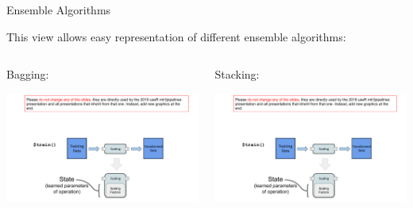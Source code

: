 \begin{frame}{Ensemble Algorithms}

	This view allows easy representation of different ensemble algorithms:

	\vspace{1cm}

		\begin{columns}
			\begin{column}{0.5\textwidth}
				Bagging:
				\begin{center}
					\includegraphics[page=20, width=\textwidth, trim=0 80 120 85, clip]{images/mlr3Pipelines_graphics}
				\end{center}
			\end{column}
			\begin{column}{0.5\textwidth}
				Stacking:
				\begin{center}
					\includegraphics[page=21, width=\textwidth, trim=0 80 120 85, clip]{images/mlr3Pipelines_graphics}
				\end{center}
			\end{column}
		\end{columns}


\end{frame}

